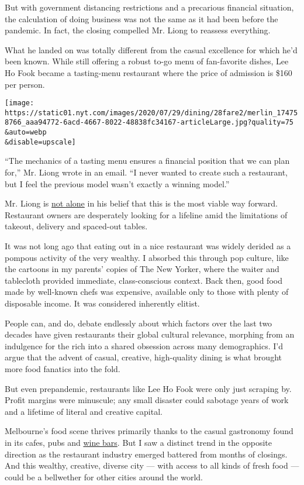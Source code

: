 But with government distancing restrictions and a precarious financial
situation, the calculation of doing business was not the same as it had
been before the pandemic. In fact, the closing compelled Mr. Liong to
reassess everything.

What he landed on was totally different from the casual excellence for
which he'd been known. While still offering a robust to-go menu of
fan-favorite dishes, Lee Ho Fook became a tasting-menu restaurant where
the price of admission is \$160 per person.

\texttt{[image: https://static01.nyt.com/images/2020/07/29/dining/28fare2/merlin\_174758766\_aaa94772-6acd-4667-8022-48838fc34167-articleLarge.jpg?quality=75\\\&auto=webp\\\&disable=upscale]}

``The mechanics of a tasting menu ensures a financial position that we
can plan for,'' Mr. Liong wrote in an email. ``I never wanted to create
such a restaurant, but I feel the previous model wasn't exactly a
winning model.''

Mr. Liong is
\href{https://www.nytimes.com/2020/07/28/dining/ever-chicago-restaurant-coronavirus.html}{not
alone} in his belief that this is the most viable way forward.
Restaurant owners are desperately looking for a lifeline amid the
limitations of takeout, delivery and spaced-out tables.

It was not long ago that eating out in a nice restaurant was widely
derided as a pompous activity of the very wealthy. I absorbed this
through pop culture, like the cartoons in my parents' copies of The New
Yorker, where the waiter and tablecloth provided immediate,
class-conscious context. Back then, good food made by well-known chefs
was expensive, available only to those with plenty of disposable income.
It was considered inherently elitist.

People can, and do, debate endlessly about which factors over the last
two decades have given restaurants their global cultural relevance,
morphing from an indulgence for the rich into a shared obsession across
many demographics. I'd argue that the advent of casual, creative,
high-quality dining is what brought more food fanatics into the fold.

But even prepandemic, restaurants like Lee Ho Fook were only just
scraping by. Profit margins were minuscule; any small disaster could
sabotage years of work and a lifetime of literal and creative capital.

Melbourne's food scene thrives primarily thanks to the casual gastronomy
found in its cafes, pubs and
\href{https://www.nytimes.com/2019/10/30/dining/melbourne-wine-bars-restaurants.html}{wine
bars}. But I saw a distinct trend in the opposite direction as the
restaurant industry emerged battered from months of closings. And this
wealthy, creative, diverse city --- with access to all kinds of fresh
food --- could be a bellwether for other cities around the world.

